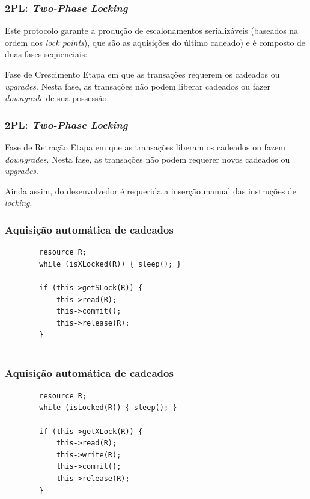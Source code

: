 \documentclass{beamer}
\begin{document}
\begin{frame} %
    \frametitle{2PL: \emph{Two-Phase Locking}}

    Este protocolo garante a produção de escalonamentos serializáveis (baseados na ordem dos \emph{lock points}), que são as aquisições do último cadeado) e é composto de duas fases sequenciais:

    \medskip
    \begin{block}{Fase de Crescimento}
        Etapa em que as transações requerem os cadeados ou \emph{upgrades}. Nesta fase, as transações não podem liberar cadeados ou fazer \emph{downgrade} de sua possessão.
    \end{block}
\end{frame}


\begin{frame} %
    \frametitle{2PL: \emph{Two-Phase Locking}}
    
    \begin{block}{Fase de Retração}
        Etapa em que as transações liberam os cadeados ou fazem \emph{downgrades}. Nesta fase, as transações não podem requerer novos cadeados ou \emph{upgrades}.
    \end{block}

    \medskip
    Ainda assim, do desenvolvedor é requerida a inserção manual das instruções de \emph{locking}.
\end{frame}


\begin{frame}[fragile] %
    \frametitle{Aquisição automática de cadeados}
    \begin{example}
    \begin{verbatim}
        resource R;
        while (isXLocked(R)) { sleep(); }
        
        if (this->getSLock(R)) {
            this->read(R);
            this->commit();
            this->release(R);
        }
        
    \end{verbatim}
    \end{example}
\end{frame}


\begin{frame}[fragile] %
    \frametitle{Aquisição automática de cadeados}

    \begin{example}
    \begin{verbatim}
        resource R;
        while (isLocked(R)) { sleep(); }

        if (this->getXLock(R)) {
            this->read(R);
            this->write(R);
            this->commit();
            this->release(R);
        }
    \end{verbatim}
    \end{example}
\end{frame}
\end{document}
